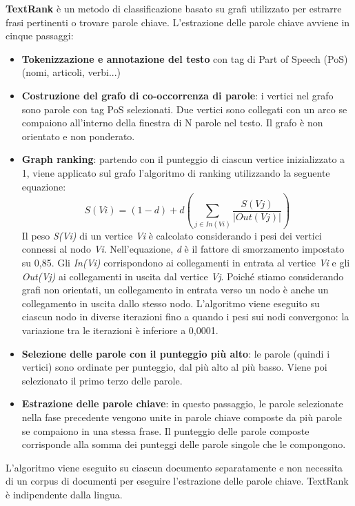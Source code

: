 \textbf{TextRank} è un metodo di classificazione basato su grafi utilizzato per estrarre frasi pertinenti o trovare parole chiave. L'estrazione delle parole chiave avviene in cinque passaggi:

\begin{itemize}
\item \textbf{Tokenizzazione e annotazione del testo} con tag di Part of Speech (PoS) (nomi, articoli, verbi...)
\item \textbf{Costruzione del grafo di co-occorrenza di parole}: i vertici nel grafo sono parole con tag PoS selezionati. Due vertici sono collegati con un arco se compaiono all'interno della finestra di N parole nel testo. Il grafo è non orientato e non ponderato.
\item \textbf{Graph ranking}: partendo con il punteggio di ciascun vertice inizializzato a 1, viene applicato sul grafo l'algoritmo di ranking utilizzando la seguente equazione:
\begin{equation}
S(Vi)=(1 - d) + d\left (\sum_{j \in In(Vi)} \frac{S(Vj)}{|Out(Vj)|}\right )
\end{equation}
Il peso \textit{S(Vi)} di un vertice \textit{Vi} è calcolato considerando i pesi dei vertici connessi al nodo \textit{Vi}. Nell'equazione, \textit{d} è il fattore di smorzamento impostato su 0,85. Gli \textit{In(Vi)} corrispondono ai collegamenti in entrata al vertice \textit{Vi} e gli \textit{Out(Vj)} ai collegamenti in uscita dal vertice \textit{Vj}. Poiché stiamo considerando grafi non orientati, un collegamento in entrata verso un nodo è anche un collegamento in uscita dallo stesso nodo. L'algoritmo viene eseguito su ciascun nodo in diverse iterazioni fino a quando i pesi sui nodi convergono: la variazione tra le iterazioni è inferiore a 0,0001.
\item \textbf{Selezione delle parole con il punteggio più alto}: le parole (quindi i vertici) sono ordinate per punteggio, dal più alto al più basso. Viene poi selezionato il primo terzo delle parole.
\item \textbf{Estrazione delle parole chiave}: in questo passaggio, le parole selezionate nella fase precedente vengono unite in parole chiave composte da più parole se compaiono in una stessa frase. Il punteggio delle parole composte corrisponde alla somma dei punteggi delle parole singole che le compongono.
\end{itemize}

L'algoritmo viene eseguito su ciascun documento separatamente e non necessita di un corpus di documenti per eseguire l'estrazione delle parole chiave. TextRank è indipendente dalla lingua.

